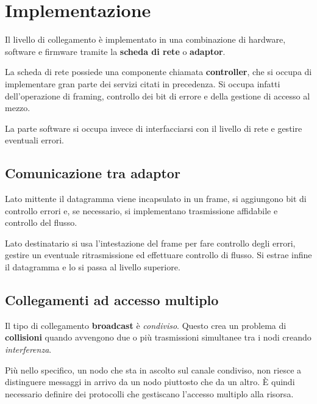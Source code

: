 \section{Implementazione}
Il livello di collegamento è implementato in una combinazione di 
hardware, software e firmware tramite la \textbf{scheda di rete} o 
\textbf{adaptor}.

La scheda di rete possiede una componente chiamata \textbf{controller},
che si occupa di implementare gran parte dei servizi citati in 
precedenza. Si occupa infatti dell'operazione di framing, controllo
dei bit di errore e della gestione di accesso al mezzo.

La parte software si occupa invece di interfacciarsi con il livello di
rete e gestire eventuali errori.

\subsection{Comunicazione tra adaptor}
Lato mittente il datagramma viene incapsulato in un frame, si 
aggiungono bit di controllo errori e, se necessario, si implementano
trasmissione affidabile e controllo del flusso.

Lato destinatario si usa l'intestazione del frame per fare controllo
degli errori, gestire un eventuale ritrasmissione ed effettuare 
controllo di flusso. Si estrae infine il datagramma e lo si passa al
livello superiore.

\subsection{Collegamenti ad accesso multiplo}
Il tipo di collegamento \textbf{broadcast} è \emph{condiviso}. Questo
crea un problema di \textbf{collisioni} quando avvengono due o più 
trasmissioni simultanee tra i nodi creando \emph{interferenza}.

Più nello specifico, un nodo che sta in ascolto sul canale condiviso,
non riesce a distinguere messaggi in arrivo da un nodo piuttosto che
da un altro. \`E quindi necessario definire dei protocolli che 
gestiscano l'accesso multiplo alla risorsa.

